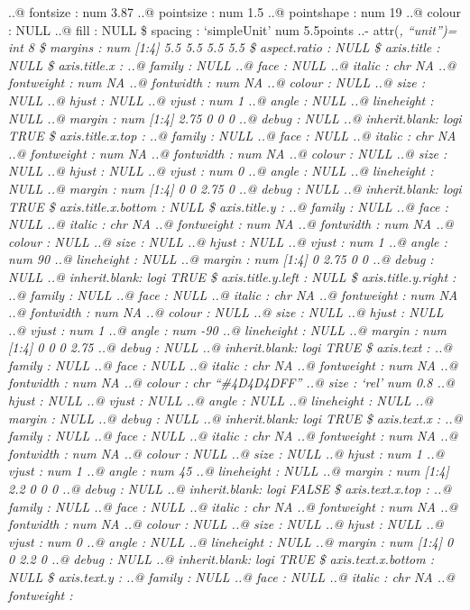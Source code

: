 \documentclass[
]{article}
\begin{document}
..@ fontsize : num 3.87 ..@ pointsize : num 1.5 ..@ pointshape : num 19
..@ colour : NULL ..@ fill : NULL \$ spacing : `simpleUnit' num
5.5points ..- attr(\emph{, ``unit'')= int 8 \$ margins : num {[}1:4{]}
5.5 5.5 5.5 5.5 \$ aspect.ratio : NULL \$ axis.title : NULL \$
axis.title.x : ..@ family : NULL ..@ face : NULL ..@ italic : chr NA ..@
fontweight : num NA ..@ fontwidth : num NA ..@ colour : NULL ..@ size :
NULL ..@ hjust : NULL ..@ vjust : num 1 ..@ angle : NULL ..@ lineheight
: NULL ..@ margin : num {[}1:4{]} 2.75 0 0 0 ..@ debug : NULL ..@
inherit.blank: logi TRUE \$ axis.title.x.top : ..@ family : NULL ..@
face : NULL ..@ italic : chr NA ..@ fontweight : num NA ..@ fontwidth :
num NA ..@ colour : NULL ..@ size : NULL ..@ hjust : NULL ..@ vjust :
num 0 ..@ angle : NULL ..@ lineheight : NULL ..@ margin : num {[}1:4{]}
0 0 2.75 0 ..@ debug : NULL ..@ inherit.blank: logi TRUE \$
axis.title.x.bottom : NULL \$ axis.title.y : ..@ family : NULL ..@ face
: NULL ..@ italic : chr NA ..@ fontweight : num NA ..@ fontwidth : num
NA ..@ colour : NULL ..@ size : NULL ..@ hjust : NULL ..@ vjust : num 1
..@ angle : num 90 ..@ lineheight : NULL ..@ margin : num {[}1:4{]} 0
2.75 0 0 ..@ debug : NULL ..@ inherit.blank: logi TRUE \$
axis.title.y.left : NULL \$ axis.title.y.right : ..@ family : NULL ..@
face : NULL ..@ italic : chr NA ..@ fontweight : num NA ..@ fontwidth :
num NA ..@ colour : NULL ..@ size : NULL ..@ hjust : NULL ..@ vjust :
num 1 ..@ angle : num -90 ..@ lineheight : NULL ..@ margin : num
{[}1:4{]} 0 0 0 2.75 ..@ debug : NULL ..@ inherit.blank: logi TRUE \$
axis.text : ..@ family : NULL ..@ face : NULL ..@ italic : chr NA ..@
fontweight : num NA ..@ fontwidth : num NA ..@ colour : chr
``\#4D4D4DFF'' ..@ size : `rel' num 0.8 ..@ hjust : NULL ..@ vjust :
NULL ..@ angle : NULL ..@ lineheight : NULL ..@ margin : NULL ..@ debug
: NULL ..@ inherit.blank: logi TRUE \$ axis.text.x : ..@ family : NULL
..@ face : NULL ..@ italic : chr NA ..@ fontweight : num NA ..@
fontwidth : num NA ..@ colour : NULL ..@ size : NULL ..@ hjust : num 1
..@ vjust : num 1 ..@ angle : num 45 ..@ lineheight : NULL ..@ margin :
num {[}1:4{]} 2.2 0 0 0 ..@ debug : NULL ..@ inherit.blank: logi FALSE
\$ axis.text.x.top : ..@ family : NULL ..@ face : NULL ..@ italic : chr
NA ..@ fontweight : num NA ..@ fontwidth : num NA ..@ colour : NULL ..@
size : NULL ..@ hjust : NULL ..@ vjust : num 0 ..@ angle : NULL ..@
lineheight : NULL ..@ margin : num {[}1:4{]} 0 0 2.2 0 ..@ debug : NULL
..@ inherit.blank: logi TRUE \$ axis.text.x.bottom : NULL \$ axis.text.y
: ..@ family : NULL ..@ face : NULL ..@ italic : chr NA ..@ fontweight :
}
\end{document}
